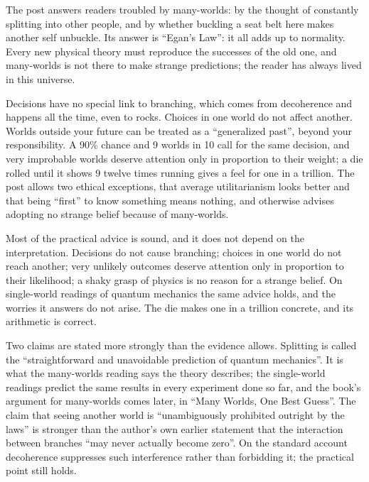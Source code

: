 \begin{afterword}
\summaryhead

The post answers readers troubled by many-worlds: by the thought of constantly splitting into other people, and by whether buckling a seat belt here makes another self unbuckle. Its answer is ``Egan's Law'': it all adds up to normality. Every new physical theory must reproduce the successes of the old one, and many-worlds is not there to make strange predictions; the reader has always lived in this universe.

Decisions have no special link to branching, which comes from decoherence and happens all the time, even to rocks. Choices in one world do not affect another. Worlds outside your future can be treated as a ``generalized past'', beyond your responsibility. A 90\% chance and 9 worlds in 10 call for the same decision, and very improbable worlds deserve attention only in proportion to their weight; a die rolled until it shows 9 twelve times running gives a feel for one in a trillion. The post allows two ethical exceptions, that average utilitarianism looks better and that being ``first'' to know something means nothing, and otherwise advises adopting no strange belief because of many-worlds.

\responsehead

Most of the practical advice is sound, and it does not depend on the interpretation. Decisions do not cause branching; choices in one world do not reach another; very unlikely outcomes deserve attention only in proportion to their likelihood; a shaky grasp of physics is no reason for a strange belief. On single-world readings of quantum mechanics the same advice holds, and the worries it answers do not arise. The die makes one in a trillion concrete, and its arithmetic is correct.

Two claims are stated more strongly than the evidence allows. Splitting is called the ``straightforward and unavoidable prediction of quantum mechanics''. It is what the many-worlds reading says the theory describes; the single-world readings predict the same results in every experiment done so far, and the book's argument for many-worlds comes later, in ``Many Worlds, One Best Guess''. The claim that seeing another world is ``unambiguously prohibited outright by the laws'' is stronger than the author's own earlier statement that the interaction between branches ``may never actually become zero''. On the standard account decoherence suppresses such interference rather than forbidding it; the practical point still holds.


\end{afterword}
